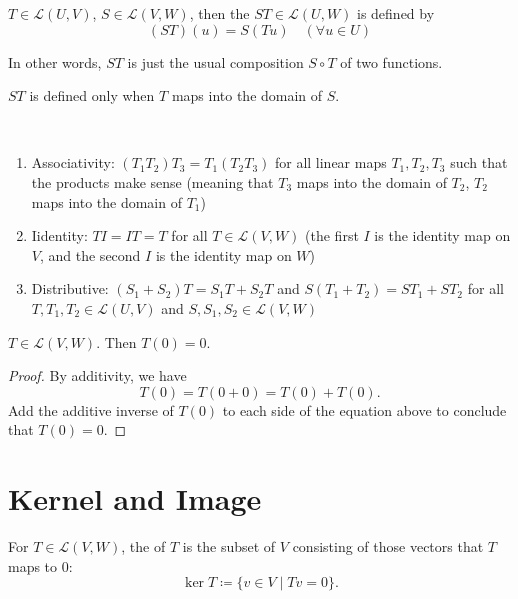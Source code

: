 \begin{definition}
$T\in\mathcal{L}(U,V)$, $S\in\mathcal{L}(V,W)$, then the  $ST\in\mathcal{L}(U,W)$ is defined by
\[(ST)(u)=S(Tu)\quad(\forall u\in U)\]
\end{definition}

\begin{remark}
In other words, $ST$ is just the usual composition $S\circ T$ of two functions.
\end{remark}

\begin{remark}
$ST$ is defined only when $T$ maps into the domain of $S$.
\end{remark}

\begin{proposition} \
\begin{enumerate}[label=(\roman*)]
\item Associativity: $(T_1T_2)T_3=T_1(T_2T_3)$ for all linear maps $T_1,T_2,T_3$ such that the products make sense (meaning that $T_3$ maps into the domain of $T_2$, $T_2$ maps into the domain of $T_1$)
\item Iidentity: $TI=IT=T$ for all $T\in\mathcal{L}(V,W)$ (the first $I$ is the identity map on $V$, and the second $I$ is the identity map on $W$)
\item Distributive: $(S_1+S_2)T=S_1T+S_2T$ and $S(T_1+T_2)=ST_1+ST_2$ for all $T,T_1,T_2\in\mathcal{L}(U,V)$ and $S,S_1,S_2\in\mathcal{L}(V,W)$
\end{enumerate}
\end{proposition}

\begin{proposition}\label{prop:linear-map-0-0}
$T\in\mathcal{L}(V,W)$. Then $T(0)=0$.
\end{proposition}

\begin{proof}
By additivity, we have
\[T(0)=T(0+0)=T(0)+T(0).\]
Add the additive inverse of $T(0)$ to each side of the equation above to conclude that $T(0)=0$.
\end{proof}

\section{Kernel and Image}
\begin{definition}[Kernel]
For $T\in\mathcal{L}(V,W)$, the  of $T$ is the subset of $V$ consisting of those vectors that $T$ maps to $0$:
\[\ker T\coloneqq\{v\in V\mid Tv=0\}.\]
\end{definition}


